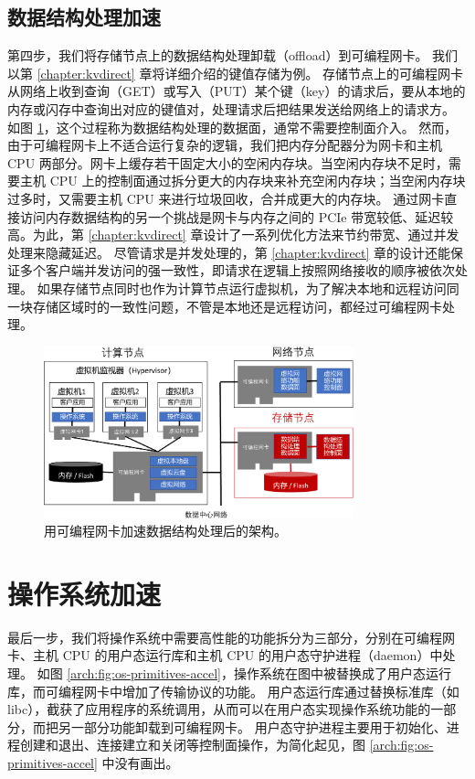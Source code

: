 \subsection{数据结构处理加速}

第四步，我们将存储节点上的数据结构处理卸载（offload）到可编程网卡。
我们以第 \ref{chapter:kvdirect} 章将详细介绍的键值存储为例。
存储节点上的可编程网卡从网络上收到查询（GET）或写入（PUT）某个键（key）的请求后，要从本地的内存或闪存中查询出对应的键值对，处理请求后把结果发送给网络上的请求方。
如图 \ref{arch:fig:data-structure-accel}，这个过程称为数据结构处理的数据面，通常不需要控制面介入。
然而，由于可编程网卡上不适合运行复杂的逻辑，我们把内存分配器分为网卡和主机 CPU 两部分。网卡上缓存若干固定大小的空闲内存块。当空闲内存块不足时，需要主机 CPU 上的控制面通过拆分更大的内存块来补充空闲内存块；当空闲内存块过多时，又需要主机 CPU 来进行垃圾回收，合并成更大的内存块。
通过网卡直接访问内存数据结构的另一个挑战是网卡与内存之间的 PCIe 带宽较低、延迟较高。为此，第 \ref{chapter:kvdirect} 章设计了一系列优化方法来节约带宽、通过并发处理来隐藏延迟。
尽管请求是并发处理的，第 \ref{chapter:kvdirect} 章的设计还能保证多个客户端并发访问的强一致性，即请求在逻辑上按照网络接收的顺序被依次处理。
如果存储节点同时也作为计算节点运行虚拟机，为了解决本地和远程访问同一块存储区域时的一致性问题，不管是本地还是远程访问，都经过可编程网卡处理。

\begin{figure}[htbp]
	\centering
	\includegraphics[width=0.8\textwidth]{figures/data_structure_accel.pdf}
	\caption{用可编程网卡加速数据结构处理后的架构。}
	\label{arch:fig:data-structure-accel}
\end{figure}

\section{操作系统加速}

最后一步，我们将操作系统中需要高性能的功能拆分为三部分，分别在可编程网卡、主机 CPU 的用户态运行库和主机 CPU 的用户态守护进程（daemon）中处理。
如图 \ref{arch:fig:os-primitives-accel}，操作系统在图中被替换成了用户态运行库，而可编程网卡中增加了传输协议的功能。
用户态运行库通过替换标准库（如 libc），截获了应用程序的系统调用，从而可以在用户态实现操作系统功能的一部分，而把另一部分功能卸载到可编程网卡。
用户态守护进程主要用于初始化、进程创建和退出、连接建立和关闭等控制面操作，为简化起见，图 \ref{arch:fig:os-primitives-accel} 中没有画出。

